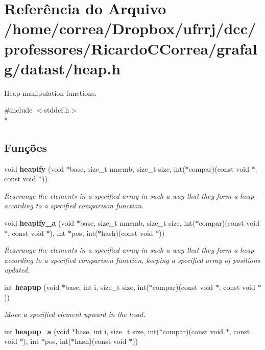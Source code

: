\section{Referência do Arquivo /home/correa/\+Dropbox/ufrrj/dcc/professores/\+Ricardo\+C\+Correa/grafalg/datast/heap.h}
\label{heap_8h}


Heap manipulation functions.  


{\ttfamily \#include $<$stddef.\+h$>$}\\*
\subsection*{Funções}
\begin{DoxyCompactItemize}
\item 
void {\bf heapify} (void $\ast$base, size\+\_\+t nmemb, size\+\_\+t size, int($\ast$compar)(const void $\ast$, const void $\ast$))
\begin{DoxyCompactList}\small\item\em Rearrange the elements in a specified array in such a way that they form a heap according to a specified comparison function. \end{DoxyCompactList}\item 
void {\bf heapify\+\_\+a} (void $\ast$base, size\+\_\+t nmemb, size\+\_\+t size, int($\ast$compar)(const void $\ast$, const void $\ast$), int $\ast$pos, int($\ast$hash)(const void $\ast$))
\begin{DoxyCompactList}\small\item\em Rearrange the elements in a specified array in such a way that they form a heap according to a specified comparison function, keeping a specified array of positions updated. \end{DoxyCompactList}\item 
int {\bf heapup} (void $\ast$base, int i, size\+\_\+t size, int($\ast$compar)(const void $\ast$, const void $\ast$))
\begin{DoxyCompactList}\small\item\em Move a specified element upward in the head. \end{DoxyCompactList}\item 
int {\bf heapup\+\_\+a} (void $\ast$base, int i, size\+\_\+t size, int($\ast$compar)(const void $\ast$, const void $\ast$), int $\ast$pos, int($\ast$hash)(const void $\ast$))

\end{DoxyCompactItemize}
